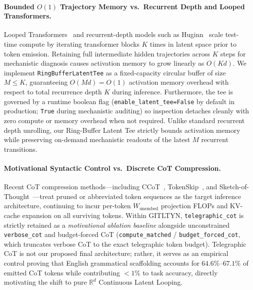 \paragraph{Bounded $O(1)$ Trajectory Memory vs.\ Recurrent Depth and Looped Transformers.}
Looped Transformers~\cite{giannou2023looped} and recurrent-depth models such as Huginn~\cite{geiping2025huginn} scale test-time compute by iterating transformer blocks $K$ times in latent space prior to token emission. Retaining full intermediate hidden trajectories across $K$ steps for mechanistic diagnosis causes activation memory to grow linearly as $O(K d)$. We implement \texttt{RingBufferLatentTee} as a fixed-capacity circular buffer of size $M \le K$, guaranteeing $O(M d) = O(1)$ activation memory overhead with respect to total recurrence depth $K$ during inference. Furthermore, the tee is governed by a runtime boolean flag (\texttt{enable\_latent\_tee=False} by default in production; \texttt{True} during mechanistic auditing) so inspection detaches cleanly with zero compute or memory overhead when not required. Unlike standard recurrent depth unrolling, our Ring-Buffer Latent Tee strictly bounds activation memory while preserving on-demand mechanistic readouts of the latest $M$ recurrent transitions.

\paragraph{Motivational Syntactic Control vs.\ Discrete CoT Compression.}
Recent CoT compression methods—including CCoT~\cite{cheng2024ccot}, TokenSkip~\cite{xia2025tokenskip}, and Sketch-of-Thought~\cite{aytes2025sketch}—treat pruned or abbreviated token sequences as the target inference architecture, continuing to incur per-token $W_{\text{unembed}}$ projection FLOPs and KV-cache expansion on all surviving tokens. Within GITLTYN, \texttt{telegraphic\_cot} is strictly retained as a \emph{motivational ablation baseline} alongside unconstrained \texttt{verbose\_cot} and budget-forced CoT (\texttt{compute\_matched} / \texttt{budget\_forced\_cot}, which truncates verbose CoT to the exact telegraphic token budget). Telegraphic CoT is not our proposed final architecture; rather, it serves as an empirical control proving that English grammatical scaffolding accounts for $64.6\%$--$67.1\%$ of emitted CoT tokens while contributing $< 1\%$ to task accuracy, directly motivating the shift to pure $\mathbb{R}^d$ Continuous Latent Looping.
